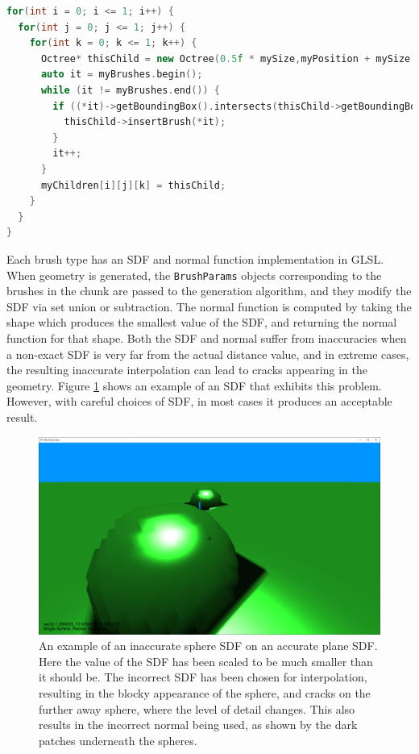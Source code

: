 \documentclass[11pt]{article}
\begin{document}
\begin{lstlisting}[language=C++,label={edit_split},caption={Snippet from \texttt{split}, showing how brushes are added to child nodes, when they are created.}]
for(int i = 0; i <= 1; i++) {
  for(int j = 0; j <= 1; j++) {
    for(int k = 0; k <= 1; k++) {
      Octree* thisChild = new Octree(0.5f * mySize,myPosition + mySize * 0.5f * glm::vec3(i,j,k), myDetailLevel + 1,myGenerator,this,glm::uvec3(i,j,k));
      auto it = myBrushes.begin();
      while (it != myBrushes.end()) {
        if ((*it)->getBoundingBox().intersects(thisChild->getBoundingBox())) {
          thisChild->insertBrush(*it);
        }
        it++;
      }
      myChildren[i][j][k] = thisChild;
    }
  }
}
\end{lstlisting}

Each brush type has an SDF and normal function implementation in GLSL. When geometry is generated, the \texttt{BrushParams} objects corresponding to the brushes in the chunk are passed to the generation algorithm, and they modify the SDF via set union or subtraction. The normal function is computed by taking the shape which produces the smallest value of the SDF, and returning the normal function for that shape. Both the SDF and normal suffer from inaccuracies when a non-exact SDF is very far from the actual distance value, and in extreme cases, the resulting inaccurate interpolation can lead to cracks appearing in the geometry. Figure \ref{fig:inaccurate_sdf} shows an example of an SDF that exhibits this problem. However, with careful choices of SDF, in most cases it produces an acceptable result.

\begin{figure}[H]
  \includegraphics[width=\textwidth]{inaccurate_sdf.png}
  \caption{An example of an inaccurate sphere SDF on an accurate plane SDF. Here the value of the SDF has been scaled to be much smaller than it should be. The incorrect SDF has been chosen for interpolation, resulting in the blocky appearance of the sphere, and cracks on the further away sphere, where the level of detail changes. This also results in the incorrect normal being used, as shown by the dark patches underneath the spheres.}
  \label{fig:inaccurate_sdf}
\end{figure}
\end{document}

